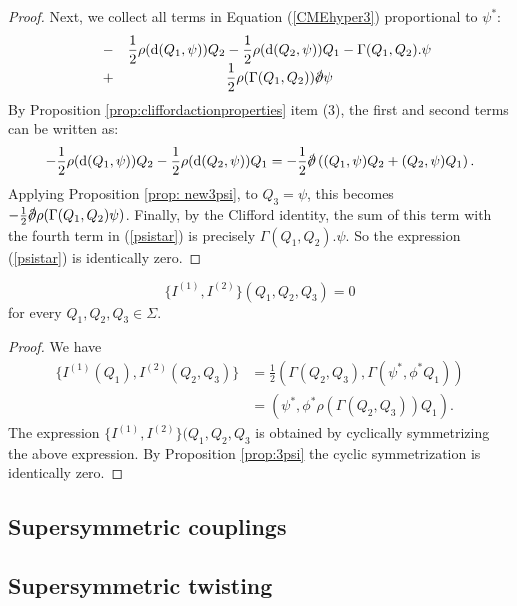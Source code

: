 \documentclass[10pt, oneside]{article}
\begin{document}
\begin{proof}
Next, we collect all terms in Equation (\ref{CMEhyper3}) proportional to $\psi^*$:
\begin{equation}\label{psistar}
\begin{array}{cccc}
& - & \displaystyle \frac{1}{2} \rho(\d(Q_1,\psi))Q_2 - \frac{1}{2} \rho(\d(Q_2, \psi)) Q_1 - \Gamma(Q_1,Q_2) . \psi
\\ 
& + &\displaystyle \frac{1}{2} \rho(\Gamma(Q_1,Q_2)) \sd \dd \psi 
\end{array}
\end{equation}
By Proposition \ref{prop:cliffordactionproperties} item (3), the first and second terms can be written as:
\[
- \frac{1}{2} \rho(\d(Q_1,\psi))Q_2 - \frac{1}{2} \rho(\d(Q_2, \psi)) Q_1 = - \frac{1}{2} \sd \dd \left( (Q_1, \psi)Q_2 + (Q_2 , \psi)Q_1 \right).
\]
Applying Proposition \ref{prop: new3psi}, to $Q_3 = \psi$, this becomes $-\frac{1}{2} \sd \dd \rho(\Gamma(Q_1,Q_2) \psi)$. 
Finally, by the Clifford identity, the sum of this term with the fourth term in (\ref{psistar}) is precisely $\Gamma(Q_1,Q_2) . \psi$.
So the expression (\ref{psistar}) is identically zero. 
\end{proof}

\begin{lemma}
\[\{I^{(1)}, I^{(2)}\}(Q_1, Q_2, Q_3) = 0\]
for every $Q_1, Q_2, Q_3\in \Sigma$.
\end{lemma}
\begin{proof}
We have
\begin{align*}
\{I^{(1)}(Q_1), I^{(2)}(Q_2, Q_3)\} & = \frac{1}{2} (\Gamma(Q_2, Q_3), \Gamma(\psi^*, \phi^* Q_1)) \\ & = (\psi^*, \phi^* \rho(\Gamma(Q_2,Q_3)) Q_1)  .
\end{align*}
The expression
$\{I^{(1)}, I^{(2)}\}(Q_1,Q_2,Q_3$ is obtained by cyclically symmetrizing the above expression. By Proposition \ref{prop:3psi} the cyclic symmetrization is identically zero.
\end{proof}

\subsection{Supersymmetric couplings}

\subsection{Supersymmetric twisting}
\end{document}
